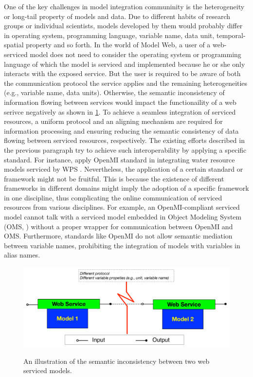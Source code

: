 \documentclass[review]{elsarticle}
\begin{document}
One of the key challenges in model integration communinity is the heterogeneity or long-tail property of models and data. Due to different habits of research groups or individual scientists, models developed by them would probably differ in operating system, programming language, variable name, data unit, temporal-spatial property and so forth. In the world of Model Web, a user of a web-serviced model does not need to consider the operating system or programming language of which the model is serviced and implemented because he or she only interacts with the exposed service. But the user is required to be aware of both the communication protocol the service applies and the remaining heterogeneities (e.g., variable name, data units). Otherwise, the semantic inconsistency of information flowing between services would impact the functionaility of a web serivce negatively as shown in \ref{semanticInconsistency}. To achieve a seamless integration of serviced resources, a uniform protocol and an aligning mechanism are required for information processing and ensuring reducing the semantic consistency of data flowing between serviced resources, respectively. The existing efforts described in the previous paragraph try to achieve such interoperability by applying a specific standard. For instance, apply OpenMI standard in integrating water resource models serviced by WPS \citep{goodall2011, castronova2013}. Nevertheless, the application of a certain standard or framework might not be fruitful. This is because the existence of different frameworks in different domains might imply the adoption of a specific framework in one discipline, thus complicating the online communication of serviced resources from various disciplines. For example, an OpenMI-compliant serviced model cannot talk with a serviced model embedded in Object Modeling System (OMS, \cite{david2013}) without a proper wrapper for communication between OpenMI and OMS. Furthermore, standards like OpenMI do not allow semantic mediation between variable names, prohibiting the integration of models with variables in alias names.

\begin{figure}[!htbp]
\centering
\includegraphics[scale=0.4]{../figures/figure_MaaS_misalignment.pdf}
\label{semanticInconsistency}
\caption{An illustration of the semantic inconsistency between two web serviced models.}
\end{figure}
\end{document}
